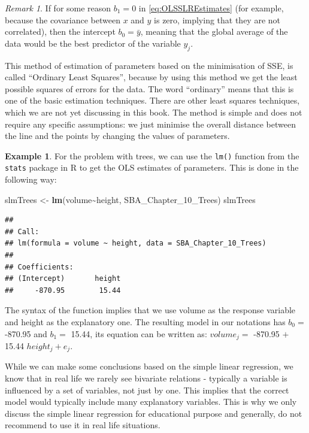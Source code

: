 \documentclass[
]{book}
\newenvironment{Shaded}{\begin{snugshade}}{\end{snugshade}}
\newcommand{\FunctionTok}[1]{\textcolor[rgb]{0.13,0.29,0.53}{\textbf{#1}}}
\newcommand{\NormalTok}[1]{#1}
\newcommand{\OtherTok}[1]{\textcolor[rgb]{0.56,0.35,0.01}{#1}}
\newcommand{\SpecialCharTok}[1]{\textcolor[rgb]{0.81,0.36,0.00}{\textbf{#1}}}
\theoremstyle{definition}
\theoremstyle{definition}
\newtheorem{example}{Example}[chapter]
\theoremstyle{definition}
\theoremstyle{definition}
\theoremstyle{remark}
\newtheorem*{remark}{Remark}
\begin{document}
\begin{remark}
If for some reason \({b}_1=0\) in \eqref{eq:OLSSLREstimates} (for example, because the covariance between \(x\) and \(y\) is zero, implying that they are not correlated), then the intercept \({b}_0 = \bar{y}\), meaning that the global average of the data would be the best predictor of the variable \(y_j\).
\end{remark}

This method of estimation of parameters based on the minimisation of SSE, is called ``Ordinary Least Squares'', because by using this method we get the least possible squares of errors for the data. The word ``ordinary'' means that this is one of the basic estimation techniques. There are other least squares techniques, which we are not yet discussing in this book. The method is simple and does not require any specific assumptions: we just minimise the overall distance between the line and the points by changing the values of parameters.

\begin{example}
For the problem with trees, we can use the \texttt{lm()} function from the \texttt{stats} package in R to get the OLS estimates of parameters. This is done in the following way:

\begin{Shaded}
\begin{Highlighting}[]
\NormalTok{slmTrees }\OtherTok{\textless{}{-}} \FunctionTok{lm}\NormalTok{(volume}\SpecialCharTok{\textasciitilde{}}\NormalTok{height, SBA\_Chapter\_10\_Trees)}
\NormalTok{slmTrees}
\end{Highlighting}
\end{Shaded}

\begin{verbatim}
## 
## Call:
## lm(formula = volume ~ height, data = SBA_Chapter_10_Trees)
## 
## Coefficients:
## (Intercept)       height  
##     -870.95        15.44
\end{verbatim}

The syntax of the function implies that we use volume as the response variable and height as the explanatory one. The resulting model in our notations has \(b_0=\) -870.95 and \(b_1=\) 15.44, its equation can be written as: \(volume_j=\) -870.95 \(+\) 15.44 \(height_j+e_j\).
\end{example}

While we can make some conclusions based on the simple linear regression, we know that in real life we rarely see bivariate relations - typically a variable is influenced by a set of variables, not just by one. This implies that the correct model would typically include many explanatory variables. This is why we only discuss the simple linear regression for educational purpose and generally, do not recommend to use it in real life situations.
\end{document}
